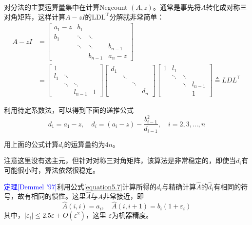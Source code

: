 \documentclass[notheorems,serif]{beamer}
\begin{document}
\begin{frame}
对分法的主要运算量集中在计算Negcount $(A, z)$。通常是事先将$A$转化成对称三对角矩阵，这样计算$A-z I$的$\mathrm{LDL}^{\mathrm{T}}$分解就非常简单：
\begin{equation*}
	\begin{aligned}
		A-z I&=\left[\begin{array}{cccc}{a_{1}-z} & {b_{1}} & {} & {} \\ {b_{1}} & {\ddots} & {\ddots} & {} \\ {} & {\ddots} & {\ddots} & {b_{n-1}} \\ {} & {} & {b_{n-1}} & {a_{n}-z}\end{array}\right]
		\\
		&=\left[\begin{array}{cccc}{1} \\ {l_{1}} & {\ddots} & {} & {} \\ {} & {\ddots} & {\ddots} & {} \\ {} & {} & {l_{n-1}} & {1}\end{array}\right]\left[\begin{array}{cccc}{d_{1}} & {} & {}&  \\ {} & {\ddots} & {} & {} \\ {}  & {} & {\ddots} & {} \\ {} & {} & {}  & {d_{n}}\end{array}\right] \left[\begin{array}{cccc}{1} & {l_{1}} & {} & {} \\ {} & {\ddots} & {\ddots} & {}  \\ {} & {} & {\ddots} & {l_{n-1}} \\ {} & {} & {} & {1}\end{array}\right] \triangleq L D L^{\top}
	\end{aligned}
\end{equation*}

利用待定系数法，可以得到下面的递推公式
\begin{equation}
d_{1}=a_{1}-z, \quad d_{i}=\left(a_{i}-z\right)-\frac{b_{i-1}^{2}}{d_{i-1}}, \quad i=2,3, \ldots, n
\label{equation5.7}
\end{equation}
\end{frame}
\begin{frame}
用上面的公式计算$d_i$的运算量约为$4n$。

注意这里没有选主元，但针对对称三对角矩阵，该算法是非常稳定的，即使当$d_i$有可能很小时，算法依然很稳定。

\textcolor{blue}{定理[Demmel ’97]}利用公式\ref{equation5.7}计算所得的$d_i$与精确计算$\hat{A}$的$\hat{d}_i$有相同的符号，故有相同的惯性。这里$\hat{A}$与$A$非常接近，即$$
\hat{A}(i, i)=a_{i}, \quad \hat{A}(i, i+1)=b_{i}\left(1+\varepsilon_{i}\right)
$$
其中，$\left|\varepsilon_{i}\right| \leq 2.5 \varepsilon+O\left(\varepsilon^{2}\right)$，这里
$\varepsilon$为机器精度。
\end{frame}
\end{document}
